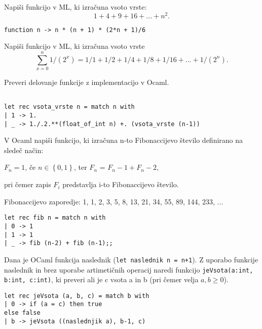 \begin{ex}
Napi\v si funkcijo v ML, ki izra\v cuna vsoto vrste: 
$$1+4+9+16+...+n^2.$$

\begin{sol}
\begin{lstlisting}
function n -> n * (n + 1) * (2*n + 1)/6
\end{lstlisting}
\end{sol}

\end{ex}
\begin{ex}
Napi\v si funkcijo v ML, ki izra\v cuna vsoto vrste 
$$\sum_{x=0}^n 1/(2^x) = 1/1+1/2+1/4+1/8+1/16+...+1/(2^n).$$

Preveri delovanje funkcije z implementacijo v Ocaml.
\begin{sol}
\begin{lstlisting}
    
let rec vsota_vrste n = match n with
| 1 -> 1.
| _ -> 1./.2.**(float_of_int n) +. (vsota_vrste (n-1))
\end{lstlisting}
\end{sol}
\end{ex}
\begin{ex}
V Ocaml napi\v si funkcijo, ki izra\v cuna n-to Fibonaccijevo \v stevilo definirano na slede\v c na\v cin:
\begin{center}
$F_n = 1$, \v ce $n\in \left\{ 0,1\right\}$, ter 
$F_n$ = $F_n-1 + F_n-2$, 
\end{center}
pri \v cemer zapis $F_i$ predstavlja i-to Fibonaccijevo \v stevilo. 

Fibonaccijevo zaporedje: 1, 1, 2, 3, 5, 8, 13, 21, 34, 55, 89, 144, 233, ...

\begin{sol}
\begin{lstlisting}
let rec fib n = match n with
| 0 -> 1
| 1 -> 1
| _ -> fib (n-2) + fib (n-1);;
\end{lstlisting}
\end{sol}



\end{ex}
\begin{ex}
Dana je OCaml funkcija naslednik (\lstinline{let naslednik n = n+1}). Z uporabo funkcije naslednik in brez uporabe artimeti\v cnih operacij naredi funkcijo \lstinline{jeVsota(a:int, b:int, c:int)}, ki preveri ali je c vsota a in b (pri \v cemer velja $a,b\geq 0$).


\begin{sol}
\begin{lstlisting}
let rec jeVsota (a, b, c) = match b with
| 0 -> if (a = c) then true
else false
| b -> jeVsota ((naslednjik a), b-1, c)
\end{lstlisting}
\end{sol}



\end{ex}
